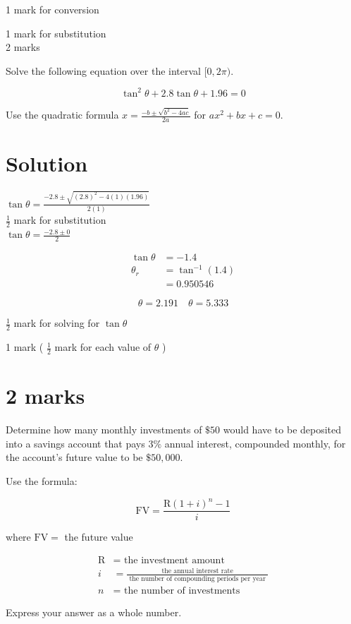 \documentclass[10pt]{article}
\begin{document}
1 mark for conversion

1 mark for substitution\\
2 marks

Solve the following equation over the interval $[0,2 \pi)$.

$$
\tan ^{2} \theta+2.8 \tan \theta+1.96=0
$$

Use the quadratic formula $x=\frac{-b \pm \sqrt{b^{2}-4 a c}}{2 a}$ for $a x^{2}+b x+c=0$.

\section*{Solution}
$\tan \theta=\frac{-2.8 \pm \sqrt{(2.8)^{2}-4(1)(1.96)}}{2(1)}$\\
$\frac{1}{2}$ mark for substitution\\
$\tan \theta=\frac{-2.8 \pm 0}{2}$

$$
\begin{aligned}
\tan \theta & =-1.4 \\
\theta_{r} & =\tan ^{-1}(1.4) \\
& =0.950546
\end{aligned}
$$

$$
\theta=2.191 \quad \theta=5.333
$$

$\frac{1}{2}$ mark for solving for $\tan \theta$

1 mark ( $\frac{1}{2}$ mark for each value of $\theta$ )

\section*{2 marks}
Determine how many monthly investments of $\$ 50$ would have to be deposited into a savings account that pays $3 \%$ annual interest, compounded monthly, for the account's future value to be $\$ 50,000$.

Use the formula:

$$
\mathrm{FV}=\frac{\mathrm{R}(1+i)^{n}-1}{i}
$$

where $\mathrm{FV}=$ the future value

$$
\begin{aligned}
\mathrm{R} & =\text { the investment amount } \\
i & =\frac{\text { the annual interest rate }}{\text { the number of compounding periods per year }} \\
n & =\text { the number of investments }
\end{aligned}
$$

Express your answer as a whole number.
\end{document}
